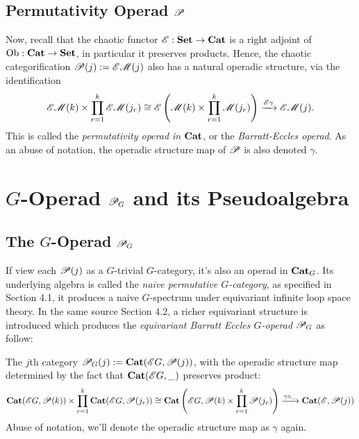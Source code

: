 \documentclass{article}
\begin{document}
\subsection{Permutativity Operad $\mathscr{P}$} \label{sub_perm_operad}
Now, recall that the chaotic functor $\mathscr{E}:\mathbf{Set}\rightarrow\mathbf{Cat}$ is a right adjoint of $\mathrm{Ob}:\mathbf{Cat}\rightarrow\mathbf{Set}$, in particular it preserves products. Hence, the chaotic categorification $\mathscr{P}(j):= \mathscr{E}\mathscr{M}(j)$ also has a natural operadic structure, via the identification
\begin{align}
    \mathscr{E}\mathscr{M}(k)\times \prod_{r=1}^k \mathscr{E}\mathscr{M}(j_r)\cong \mathscr{E}\left(\mathscr{M}(k)\times\prod_{r=1}^k\mathscr{M}(j_r)\right) \xrightarrow{\mathscr{E}\gamma}\mathscr{E}\mathscr{M}(j).
\end{align}
This is called the \emph{permutativity operad in $\mathbf{Cat}$}, or the \emph{Barratt-Eccles operad}. As an abuse of notation, the operadic structure map of $\mathscr{P}$ is also denoted $\gamma$.

\newpage

\section{$G$-Operad $\mathscr{P}_G$ and its Pseudoalgebra}\label{sec_perm_G}
\subsection{The $G$-Operad $\mathscr{P}_G$}\label{sub_perm_G}
If view each $\mathscr{P}(j)$ as a $G$-trivial $G$-category, it's also an operad in $\mathbf{Cat}_G$. Its underlying algebra is called the \emph{naive permutative $G$-category}, as specified in \cite{GM17} Section 4.1, it produces a naive $G$-spectrum under equivariant infinite loop space theory. In the same source Section 4.2, a richer equivariant structure is introduced which produces the \emph{equivariant Barratt Eccles $G$-operad} $\mathscr{P}_G$ as follow:
\begin{defn}\label{defn_perm_G}
    The $j$th category $\mathscr{P}_G(j) := \mathbf{Cat}(\mathscr{E}G,\mathscr{P}(j))$, with the operadic structure map determined by the fact that $\mathbf{Cat}(\mathscr{E}G,\_)$ preserves product:
    \begin{align}
        \mathbf{Cat}(\mathscr{E}G,\mathscr{P}(k))\times \prod_{r=1}^k\mathbf{Cat}(\mathscr{E}G,\mathscr{P}(j_r))\cong \mathbf{Cat}\left(\mathscr{E}G,\mathscr{P}(k)\times \prod_{r=1}^k\mathscr{P}(j_r)\right)\xrightarrow{\gamma\circ\_}\mathbf{Cat}(\mathscr{E},\mathscr{P}(j))
    \end{align}
    Abuse of notation, we'll denote the operadic structure map as $\gamma$ again.
\end{defn}
\end{document}
